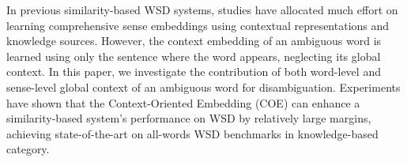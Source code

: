 In previous similarity-based WSD systems, studies have allocated much effort on learning comprehensive sense embeddings using contextual representations and knowledge sources. However, the context embedding of an ambiguous word is learned using only the sentence where the word appears, neglecting its global context. In this paper, we investigate the contribution of both word-level and sense-level global context of an ambiguous word for disambiguation. Experiments have shown that the Context-Oriented Embedding (COE) can enhance a similarity-based system's performance on WSD by relatively large margins, achieving state-of-the-art on all-words WSD benchmarks in knowledge-based category.
